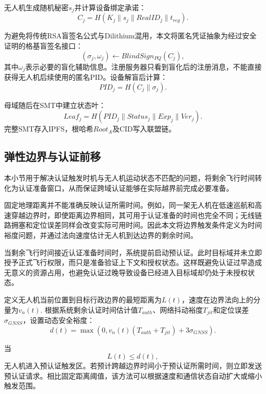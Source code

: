 \documentclass[conference]{IEEEtran}
\begin{document}
	无人机生成随机秘密$s_j$并计算设备绑定承诺：
	\begin{equation}
		C_j=H(K_j\parallel s_j\parallel RealID_j\parallel t_{reg}).
	\end{equation}
	
	为避免将传统RSA盲签名公式与Dilithium混用，本文将匿名凭证抽象为经过安全证明的格基盲签名接口：
	\begin{equation}
		(\sigma_j,\omega_j)\leftarrow BlindSign_{PQ}(C_j),
	\end{equation}
	其中$\omega_j$表示必要的盲化辅助信息。注册服务器只看到盲化后的注册消息，不能直接获得无人机后续使用的匿名PID。设备解盲后计算：
	\begin{equation}
		PID_j=H(C_j\parallel \sigma_j).
	\end{equation}
	
	母域随后在SMT中建立状态叶：
	\begin{equation}
		Leaf_j=H(PID_j\parallel Status_j\parallel Exp_j\parallel Ver_j).
	\end{equation}
	完整SMT存入IPFS，根哈希$Root_A$及CID写入联盟链。
	
	\subsection{弹性边界与认证前移}
	
	本小节用于解决认证触发时机与无人机运动状态不匹配的问题，将剩余飞行时间转化为认证准备窗口，从而保证跨域认证能够在实际越界前完成必要准备。
	
	固定地理距离并不能准确反映认证所需时间。例如，同一架无人机在低速巡航和高速穿越边界时，即使距离边界相同，其可用于认证准备的时间也完全不同；无线链路拥塞和定位误差同样会改变实际可用时间。因此本文将边界触发条件定义为时间裕度问题，并通过法向速度估计无人机到达边界的剩余时间。
	
	当剩余飞行时间接近认证准备时间时，系统提前启动预认证。此时目标域并未立即授予正式飞行权限，而只是准备验证上下文和授权状态。这样既避免认证过早造成无意义的资源占用，也避免认证过晚导致设备已经进入目标域却仍处于未授权状态。
	
	定义无人机当前位置到目标行政边界的最短距离为$L(t)$，速度在边界法向上的分量为$v_n(t)$. 根据系统剩余认证时间估计值$T_{auth}$、网络抖动裕度$T_{jit}$和定位误差$\sigma_{GNSS}$，设置动态安全裕度：
	\begin{equation}
		d(t)=\max(0,v_n(t)(T_{auth}+T_{jit})+3\sigma_{GNSS}).
	\end{equation}
	
	当
	\begin{equation}
		L(t)\le d(t),
	\end{equation}
	无人机进入预认证触发区。若预计跨越边界时间小于预认证所需时间，则立即发送预认证请求。相比固定距离阈值，该方法可以根据速度和通信状态自动扩大或缩小触发范围。
	
\end{document}
